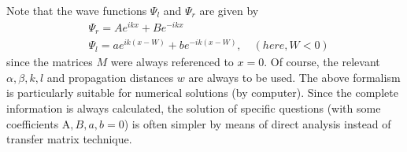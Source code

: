 Note that the wave functions $Ψ_l$ and $Ψ_r$ are given by
\begin{equation}
    \begin{split}
        &\Psi_r = Ae^{ikx}+Be^{-ikx}\\
        &\Psi_l = ae^{ik(x-W)}+be^{-ik(x-W)},\quad (here, W<0)
    \end{split}
\end{equation}
since the matrices $M$ were always referenced to $x = 0$. Of course, the relevant $\alpha, \beta, k, l$ and propagation distances $w$ are always to be used. The above formalism is particularly suitable for numerical solutions (by computer). Since the complete information is always calculated, the solution of specific questions (with some coefficients A$, B, a, b = 0$) is often simpler by means of direct analysis instead of transfer matrix technique.

